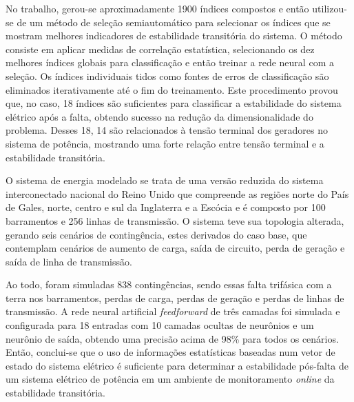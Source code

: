 \documentclass[12pt,oneside,a4paper,chapter=TITLE,section=TITLE,sumario=tradicional,english,brazil]{abntex2}
\begin{document}
	No trabalho, gerou-se aproximadamente 1900 índices compostos e então utilizou-se de um método de seleção semiautomático para selecionar os índices que se mostram melhores indicadores de estabilidade transitória do sistema. O método consiste em aplicar medidas de correlação estatística, selecionando os dez melhores índices globais para classificação e então treinar a rede neural com a seleção. Os índices individuais tidos como fontes de erros de classificação são eliminados iterativamente até o fim do treinamento. Este procedimento provou que, no caso, 18 índices são suficientes para classificar a estabilidade do sistema elétrico após a falta, obtendo sucesso na redução da dimensionalidade do problema. Desses 18, 14 são relacionados à tensão terminal dos geradores no sistema de potência, mostrando uma forte relação entre tensão terminal e a estabilidade transitória.\par
	O sistema de energia modelado se trata de uma versão reduzida do sistema interconectado nacional do Reino Unido que compreende as regiões norte do País de Gales, norte, centro e sul da Inglaterra e a Escócia e é composto por 100 barramentos e 256 linhas de transmissão. O sistema teve sua topologia alterada, gerando seis cenários de contingência, estes derivados do caso base, que contemplam cenários de aumento de carga, saída de circuito, perda de geração e saída de linha de transmissão.\par 
	Ao todo, foram simuladas 838 contingências, sendo essas falta trifásica com a terra nos barramentos, perdas de carga, perdas de geração e perdas de linhas de transmissão. A rede neural artificial \textit{feedforward} de três camadas foi simulada e configurada para 18 entradas com 10 camadas ocultas de neurônios e um neurônio de saída, obtendo uma precisão acima de 98\% para todos os cenários. Então, conclui-se que o uso de informações estatísticas baseadas num vetor de estado do sistema elétrico é suficiente para determinar a estabilidade pós-falta de um sistema elétrico de potência em um ambiente de monitoramento \textit{online} da estabilidade transitória.\par 
	
\end{document}

